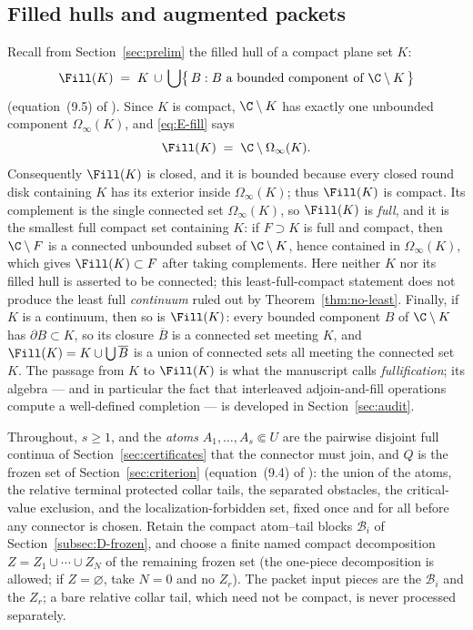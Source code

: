 \subsection{Filled hulls and augmented packets}\label{subsec:E-packet-def}

Recall from Section~\ref{sec:prelim} the filled hull of a compact plane set $K$:
\begin{equation}\label{eq:E-fill}
\Fill(K)\;=\;K\,\cup\,\bigcup\bigl\{\,B : B\ \text{a bounded component of}\
\C\setminus K\,\bigr\}
\end{equation}
(equation~(9.5) of \cite{MWman}). Since $K$ is compact, $\C\setminus K$ has exactly
one unbounded component $\Omega_\infty(K)$, and \eqref{eq:E-fill} says
\[
\Fill(K)\;=\;\C\setminus\Omega_\infty(K).
\]
Consequently $\Fill(K)$ is closed, and it is bounded because every closed round disk
containing $K$ has its exterior inside $\Omega_\infty(K)$; thus $\Fill(K)$ is compact.
Its complement is the single connected set $\Omega_\infty(K)$, so $\Fill(K)$ is
\emph{full}, and it is the smallest full compact set containing $K$: if $F\supset K$
is full and compact, then $\C\setminus F$ is a connected unbounded subset of
$\C\setminus K$, hence contained in $\Omega_\infty(K)$, which gives
$\Fill(K)\subset F$ after taking complements.  Here neither $K$ nor its
filled hull is asserted to be connected; this least-full-compact statement
does not produce the least full \emph{continuum} ruled out by
Theorem~\ref{thm:no-least}.  Finally, if $K$ is a continuum, then so
is $\Fill(K)$: every bounded component $B$ of $\C\setminus K$ has
$\partial B\subset K$, so its closure $\overline B$ is a connected set meeting $K$,
and $\Fill(K)=K\cup\bigcup\overline B$ is a union of connected sets all meeting the
connected set $K$. The passage from $K$ to $\Fill(K)$ is what the manuscript calls
\emph{fullification}; its algebra --- and in particular the fact that interleaved
adjoin-and-fill operations compute a well-defined completion --- is developed in
Section~\ref{sec:audit}.

Throughout, $s\ge1$, and the \emph{atoms}
$A_1,\dots,A_s\Subset U$ are the pairwise disjoint full
continua of Section~\ref{sec:certificates} that the connector must join, and $Q$ is
the frozen set of Section~\ref{sec:criterion} (equation~(9.4) of \cite{MWman}): the
union of the atoms, the relative terminal protected collar tails, the separated obstacles,
the critical-value exclusion, and the localization-forbidden set, fixed once and for
all before any connector is chosen.  Retain the compact atom--tail blocks
$\mathcal B_i$ of Section~\ref{subsec:D-frozen}, and choose a finite named compact
decomposition $Z=Z_1\cup\cdots\cup Z_N$ of the remaining frozen set
(the one-piece decomposition is allowed; if $Z=\varnothing$, take $N=0$
and no $Z_r$).  The packet input pieces are
the $\mathcal B_i$ and the $Z_r$; a bare relative collar tail, which need not be
compact, is never processed separately.

